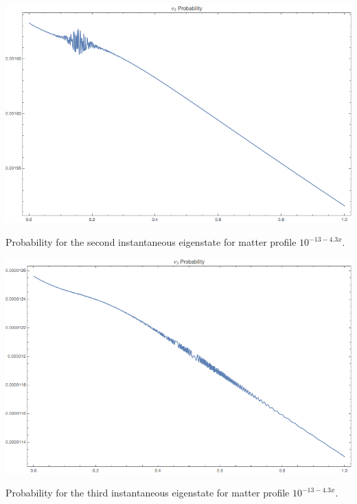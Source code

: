 \documentclass{tufte-handout}
\begin{document}
\begin{marginfigure}[3\baselineskip]
\includegraphics{assets/numericalMSW3Flavor-Inst-Eigen-prob-2.png}
\caption{Probability for the second instantaneous eigenstate for matter profile $10^{-13 - 4.3 x}$.}
\label{fig:numericalMSW3Flavor-Inst-Eigen-prob-2}
\end{marginfigure}

\begin{marginfigure}[3\baselineskip]
\includegraphics{assets/numericalMSW3Flavor-Inst-Eigen-prob-3.png}
\caption{Probability for the third instantaneous eigenstate for matter profile $10^{-13 - 4.3 x}$.}
\label{fig:numericalMSW3Flavor-Inst-Eigen-prob-3}
\end{marginfigure}
\end{document}
